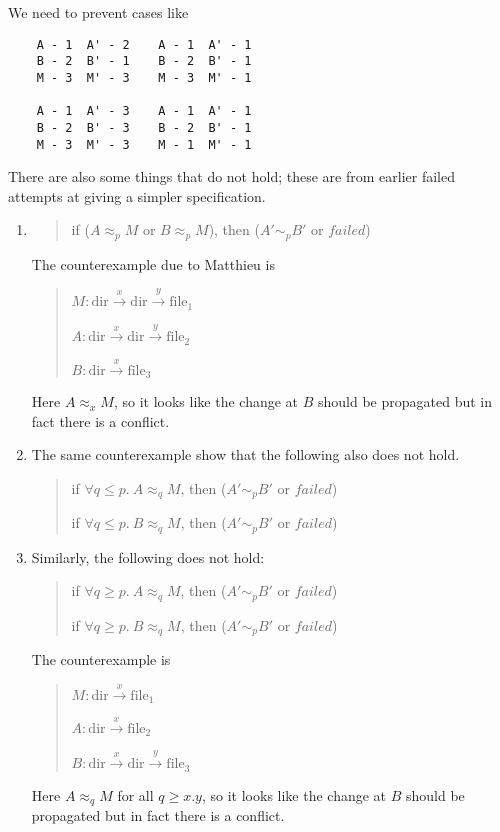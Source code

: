 \documentclass[12pt]{article}
\newcommand{\dir}{\ensuremath{\mathrm{dir}}}
\newcommand{\failed}{\ensuremath{\mathit{failed}}}
\newcommand{\To}[1]{\stackrel{#1}{\longrightarrow}}
\newcommand{\agreeAt}[1]{\sim_{#1}}
\newcommand{\AgreeAt}[1]{\approx_{#1}}
\begin{document}
We need to prevent cases like

\begin{verbatim}
    A - 1  A' - 2    A - 1  A' - 1
    B - 2  B' - 1    B - 2  B' - 1
    M - 3  M' - 3    M - 3  M' - 1

    A - 1  A' - 3    A - 1  A' - 1
    B - 2  B' - 3    B - 2  B' - 1
    M - 3  M' - 3    M - 1  M' - 1
\end{verbatim}


There are also some things that do not hold; these are from earlier
failed attempts at giving a simpler specification.

\begin{enumerate}
\item 
  \begin{quote}
    if ($A\AgreeAt{p} M$ or $B\AgreeAt{p} M$),
    then ($A'\agreeAt{p} B'$ or $\failed$)
  \end{quote}
  The counterexample due to Matthieu is
  \begin{quote}
    $M: \dir{}\To{x}\dir{}\To{y}\textrm{file}_1$
    
    $A: \dir{}\To{x}\dir{}\To{y}\textrm{file}_2$
    
    $B: \dir{}\To{x}\textrm{file}_3$
  \end{quote}
  Here $A\AgreeAt{x}M$, so it looks like the change at $B$ should be
  propagated but in fact there is a conflict.

\item The same counterexample show that the following also does not hold.
  \begin{quote}
    if $\forall q\leq p.\ A\AgreeAt{q} M$,
    then ($A'\agreeAt{p} B'$ or $\failed$)

    if $\forall q\leq p.\ B\AgreeAt{q} M$,
    then ($A'\agreeAt{p} B'$ or $\failed$)
  \end{quote}

\item Similarly, the following does not hold:
  \begin{quote}
    if $\forall q\geq p.\ A\AgreeAt{q} M$,
    then ($A'\agreeAt{p} B'$ or $\failed$)

    if $\forall q\geq p.\ B\AgreeAt{q} M$,
    then ($A'\agreeAt{p} B'$ or $\failed$)
  \end{quote}
  The counterexample is
  \begin{quote}
    $M: \dir{}\To{x}\textrm{file}_1$
    
    $A: \dir{}\To{x}\textrm{file}_2$
    
    $B: \dir{}\To{x}\dir{}\To{y}\textrm{file}_3$
  \end{quote}
  Here $A\AgreeAt{q}M$ for all $q\geq x.y$, so it looks like the change
  at $B$ should be propagated but in fact there is a conflict.
\end{enumerate}
\end{document}
